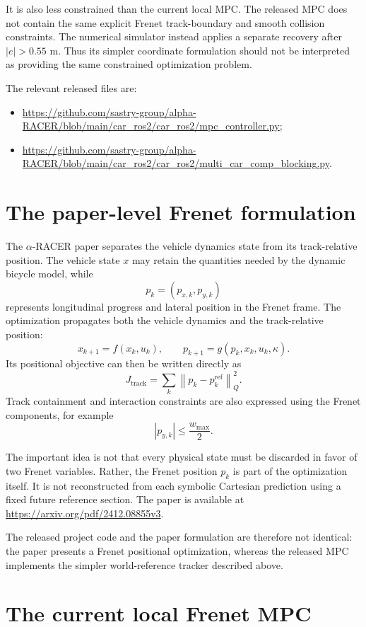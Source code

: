 \documentclass[11pt]{article}
\begin{document}
It is also less constrained than the current local MPC. The released MPC does
not contain the same explicit Frenet track-boundary and smooth collision
constraints. The numerical simulator instead applies a separate recovery after
$|e|>0.55$ m. Thus its simpler coordinate formulation should not be interpreted
as providing the same constrained optimization problem.

The relevant released files are:
\begin{itemize}
  \item \url{https://github.com/sastry-group/alpha-RACER/blob/main/car_ros2/car_ros2/mpc_controller.py};
  \item \url{https://github.com/sastry-group/alpha-RACER/blob/main/car_ros2/car_ros2/multi_car_comp_blocking.py}.
\end{itemize}

\section{The paper-level Frenet formulation}

The $\alpha$-RACER paper separates the vehicle dynamics state from its
track-relative position. The vehicle state $x$ may retain the quantities needed
by the dynamic bicycle model, while
\[
  p_k=(p_{x,k},p_{y,k})
\]
represents longitudinal progress and lateral position in the Frenet frame. The
optimization propagates both the vehicle dynamics and the track-relative
position:
\[
  x_{k+1}=f(x_k,u_k),
  \qquad
  p_{k+1}=g(p_k,x_k,u_k,\kappa).
\]
Its positional objective can then be written directly as
\[
  J_{\mathrm{track}}
  =\sum_k
  \left\|p_k-p_k^{\mathrm{ref}}\right\|_Q^2.
\]
Track containment and interaction constraints are also expressed using the
Frenet components, for example
\[
  |p_{y,k}|\leq\frac{w_{\max}}{2}.
\]

The important idea is not that every physical state must be discarded in favor
of two Frenet variables. Rather, the Frenet position $p_k$ is part of the
optimization itself. It is not reconstructed from each symbolic Cartesian
prediction using a fixed future reference section. The paper is available at
\url{https://arxiv.org/pdf/2412.08855v3}.

The released project code and the paper formulation are therefore not identical:
the paper presents a Frenet positional optimization, whereas the released MPC
implements the simpler world-reference tracker described above.

\section{The current local Frenet MPC}
\end{document}
